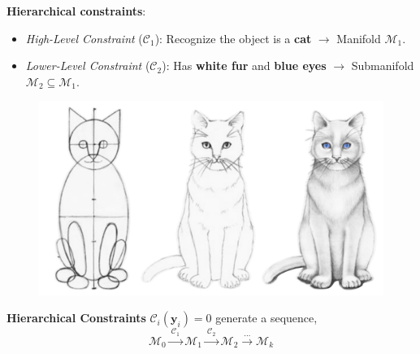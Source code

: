 
    
\begin{frame}
    \textbf{Hierarchical constraints}:
    \begin{itemize}
        \item \textit{High-Level Constraint} ($\mathcal{C}_1$): Recognize the object is a \textbf{cat} $\rightarrow$ Manifold $\mathcal{M}_1$.
        \item \textit{Lower-Level Constraint} ($\mathcal{C}_2$): Has \textbf{white fur} and \textbf{blue eyes} $\rightarrow$ Submanifold $\mathcal{M}_2 \subseteq \mathcal{M}_1$.
    \end{itemize}

    \begin{figure}
        \centering
        \includegraphics[width=0.35\linewidth]{image10.png}
    \end{figure}

    \begin{tcolorbox}[colback=cyan!40, colframe=gray!70, title={The reduced, hierarchical manifold}]
    \textbf{Hierarchical Constraints}
    $
        \mathcal{C}_i(\mathbf{y}_i) = 0
    $  generate a sequence, $$\mathcal{M}_0 \xrightarrow{\ \mathcal{C}_1\ } \mathcal{M}_1 \xrightarrow{\ \mathcal{C}_2\ } \mathcal{M}_2 \xrightarrow{\ \dots\ } \mathcal{M}_k$$
    \end{tcolorbox}

\end{frame}


